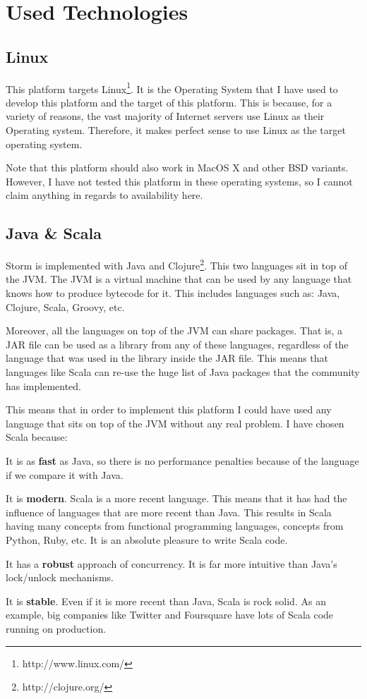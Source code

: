  
\section{Used Technologies}

\subsection{Linux}

This platform targets Linux\footnote{http://www.linux.com/}. It is the Operating
System that I have used to develop this platform and the target of this
platform. This is because, for a variety of reasons, the vast majority of
Internet servers use Linux as their Operating system. Therefore, it makes
perfect sense to use Linux as the target operating system.

Note that this platform should also work in MacOS X and other \acs{BSD}
variants. However, I have not tested this platform in these operating systems,
so I cannot claim anything in regards to availability here.

\subsection{Java \& Scala}

Storm is implemented with Java and Clojure\footnote{http://clojure.org/}. This
two languages sit in top of
the \ac{JVM}. The \ac{JVM} is a virtual machine that can be used by any language
that knows how to produce bytecode for it. This includes languages such as:
Java, Clojure, Scala, Groovy, etc.

Moreover, all the languages on top of the \ac{JVM} can share packages. That is,
a \acs{JAR} file can be used as a library from any of these languages,
regardless of the language that was used in the library inside the \acs{JAR}
file. This means that languages like Scala can re-use the huge list of Java
packages that the community has implemented.

This means that in order to implement this platform I could have used any
language that sits on top of the \ac{JVM} without any real problem. I have
chosen Scala\cite{scala} because:

\mylist
  \item It is as {\bf fast} as Java, so there is no performance penalties
because of the language if we compare it with Java.
  \item It is {\bf modern}. Scala is a more recent language. This means that it
has had the influence of languages that are more recent than Java. This results
in Scala having many concepts from functional programming languages, concepts
from Python, Ruby, etc. It is an absolute pleasure to write Scala code.
  \item It has a {\bf robust} approach of concurrency. It is far more intuitive
than Java's lock/unlock mechanisms.
  \item It is {\bf stable}. Even if it is more recent than Java, Scala is rock
solid. As an example, big companies like Twitter and Foursquare have lots of
Scala code running on production.
\mylistend

